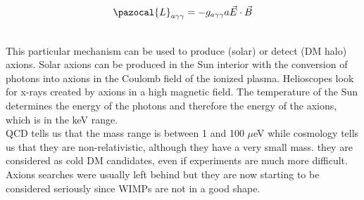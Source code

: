 \documentclass[10.75pt,a4paper,openright,bottom=2cm]{article}
\begin{document}
\begin{minipage}{0.5\textwidth}
\[\pazocal{L}_{a\gamma\gamma}=-g_{a\gamma\gamma}a\Vec{E}\cdot\Vec{B}\]
\end{minipage}\\
This particular mechanism can be used to produce (solar) or detect (DM halo) axions. Solar axions can be produced in the Sun interior with the conversion of photons into axions in the Coulomb field of the ionized plasma. Helioscopes look for x-rays created by axions in a high magnetic field. The temperature of the Sun determines the energy of the photons and therefore the energy of the axions, which is in the keV range.\\
QCD tells us that the mass range is between 1 and 100 $\mu$eV while cosmology tells us that they are non-relativistic, although they have a very small mass. they are considered as cold DM candidates, even if experiments are much more difficult. Axions searches were usually left behind but they are now starting to be considered seriously since WIMPs are not in a good shape.
\newpage
\end{document}
